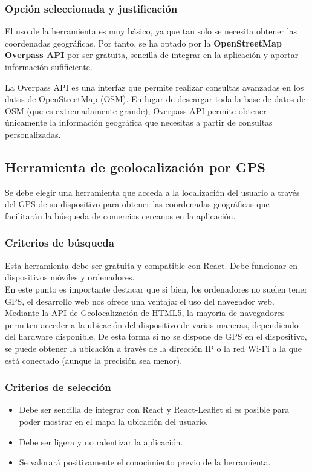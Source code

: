 \subsubsection{Opción seleccionada y justificación}
El uso de la herramienta es muy básico, ya que tan solo se necesita obtener las coordenadas geográficas. Por tanto, se ha optado por la \textbf{OpenStreetMap Overpass API} por ser gratuita, sencilla de integrar en la aplicación y aportar información sufificiente.

La Overpass API es una interfaz que permite realizar consultas avanzadas en los datos de OpenStreetMap (OSM). En lugar de descargar toda la base de datos de OSM (que es extremadamente grande), Overpass API permite obtener únicamente la información geográfica que necesitas a partir de consultas personalizadas\cite{overpassAPI2023}.


\subsection{Herramienta de geolocalización por GPS}
Se debe elegir una herramienta que acceda a la localización del usuario a través del GPS de su dispositivo para obtener las coordenadas geográficas que facilitarán la búsqueda de comercios cercanos en la aplicación. 

\subsubsection{Criterios de búsqueda}
Esta herramienta debe ser gratuita y compatible con React. Debe funcionar en dispositivos móviles y ordenadores. \\

En este punto es importante destacar que si bien, los ordenadores no suelen tener GPS, el desarrollo web nos ofrece una ventaja: el uso del navegador web. Mediante la API de Geolocalización de HTML5, la mayoría de navegadores permiten acceder a la ubicación del dispositivo de varias maneras, dependiendo del hardware disponible. De esta forma si no se dispone de GPS en el dispositivo, se puede obtener la ubicación a través de la dirección IP o la red Wi-Fi a la que está conectado (aunque la precisión sea menor).

\subsubsection{Criterios de selección}
\begin{itemize}
    \item Debe ser sencilla de integrar con React y React-Leaflet si es posible para poder mostrar en el mapa la ubicación del usuario.
    \item Debe ser ligera y no ralentizar la aplicación.
    \item Se valorará positivamente el conocimiento previo de la herramienta. 
\end{itemize}

